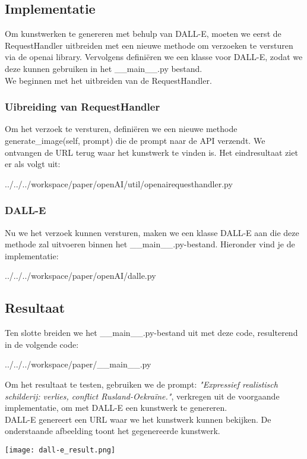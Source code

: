 \subsection{Implementatie}
Om kunstwerken te genereren met behulp van DALL-E, moeten we eerst de RequestHandler uitbreiden met een nieuwe methode om verzoeken te versturen via de openai library. Vervolgens definiëren we een klasse voor DALL-E, zodat we deze kunnen gebruiken in het 
\_\_main\_\_.py bestand. \\

We beginnen met het uitbreiden van de RequestHandler.

\subsubsection{Uibreiding van RequestHandler}
Om het verzoek te versturen, definiëren we een nieuwe methode generate\_image(self, prompt) die de prompt naar de API verzendt. We ontvangen de URL terug waar het kunstwerk te vinden is. Het eindresultaat ziet er als volgt uit:
\begin{pythoncode}{../../../workspace/paper/openAI/util/openairequesthandler.py}
\end{pythoncode}

\subsubsection{DALL-E}
Nu we het verzoek kunnen versturen, maken we een klasse DALL-E aan die deze methode zal uitvoeren binnen het  \_\_main\_\_.py-bestand. Hieronder vind je de implementatie:
\begin{pythoncode}{../../../workspace/paper/openAI/dalle.py}
\end{pythoncode}
    
\subsection{Resultaat}
Ten slotte breiden we het \_\_main\_\_.py-bestand uit met deze code, resulterend in de volgende code:
\begin{pythoncode}{../../../workspace/paper/__main__.py}
\end{pythoncode}
Om het resultaat te testen, gebruiken we de prompt: \emph{"Expressief realistisch schilderij: verlies, conflict Rusland-Oekraïne."}, verkregen uit de voorgaande implementatie, om met DALL-E een kunstwerk te genereren. \\

DALL-E genereert een URL waar we het kunstwerk kunnen bekijken. De onderstaande afbeelding toont het gegenereerde kunstwerk.

\begin{center}
    \texttt{[image: dall-e\_result.png]}
    \label{fig:dall-e_result}
\end{center}
